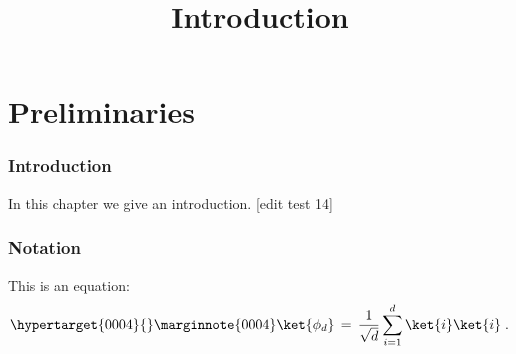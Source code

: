

%
\usepackage{marginnote}


\title{Introduction}
\hypertarget{0000}{}
\reversemarginpar{}
\label{introduction}


\maketitle


\tableofcontents

\part{Preliminaries}
\label{book-part-preliminaries}

\hypertarget{0002}{}
\reversemarginpar{}
\section{Introduction}
\label{section:introduction}

In this chapter we give an introduction. [edit test 14]

\hypertarget{0003}{}
\reversemarginpar{}
\section{Notation}
\label{section-notation}

This is an equation:
\begin{equation}
\hypertarget{0004}{}
\reversemarginpar\marginnote{\textnormal{0004}}
\label{eq:me-state}
 \ket{\phi_d} \,=\,\frac{1}{\sqrt{d}} \sum_{i=1}^d \ket{i}\ket{i}\;.
\end{equation}








